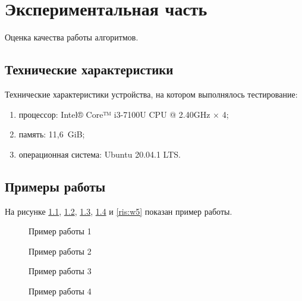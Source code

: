 


\chapter{Экспериментальная часть}\label{exp}

Оценка качества работы алгоритмов.

\section{Технические характеристики}\label{texcharacters}

Технические характеристики устройства, на котором выполнялось тестирование:

\begin{enumerate}
    \item процессор: Intel® Core™ i3-7100U CPU @ 2.40GHz × 4; 
    \item память: 11,6 GiB;
    \item операционная система: Ubuntu 20.04.1 LTS.
\end{enumerate}

\section{Примеры работы}\label{examples}

На рисунке \ref{ris:w1},  \ref{ris:w2},  \ref{ris:w3},  \ref{ris:w4} и \ref{ris:w5} показан пример работы.

  
\begin{figure}[H]
    \center{\texttt{[image: w1]}}
    \caption{Пример работы 1}
    \label{ris:w1}
\end{figure}
\begin{figure}[H]
    \center{\texttt{[image: w2]}}
    \caption{Пример работы 2}
    \label{ris:w2}
\end{figure}

\begin{figure}[H]
    \center{\texttt{[image: w3]}}
    \caption{Пример работы 3}
    \label{ris:w3}
\end{figure}

\begin{figure}[H]
    \center{\texttt{[image: w4]}}
    \caption{Пример работы 4}
    \label{ris:w4}
\end{figure}

